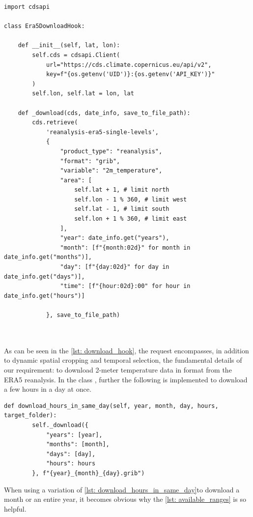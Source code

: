 \begin{lstlisting}[caption=Download Hook for ERA5 Data, label=lst: download_hook]
import cdsapi

class Era5DownloadHook:
    
    def __init__(self, lat, lon):
        self.cds = cdsapi.Client(
            url="https://cds.climate.copernicus.eu/api/v2",
            key=f"{os.getenv('UID')}:{os.getenv('API_KEY')}"
        )
        self.lon, self.lat = lon, lat

    def _download(cds, date_info, save_to_file_path):
        cds.retrieve(
            'reanalysis-era5-single-levels',
            {
                "product_type": "reanalysis",
                "format": "grib",
                "variable": "2m_temperature",
                "area": [
                    self.lat + 1, # limit north
                    self.lon - 1 % 360, # limit west
                    self.lat - 1, # limit south
                    self.lon + 1 % 360, # limit east
                ],
                "year": date_info.get("years"),
                "month": [f"{month:02d}" for month in date_info.get("months")],
                "day": [f"{day:02d}" for day in date_info.get("days")],
                "time": [f"{hour:02d}:00" for hour in date_info.get("hours")]

            }, save_to_file_path)



\end{lstlisting}

As can be seen in the \autoref{lst: download_hook}, the request encompasses, in addition to dynamic spatial cropping and temporal selection, the fundamental details of our requirement: to download 2-meter temperature data in  format from the ERA5 reanalysis.
In the class , further the following is implemented to download a few hours in a day at once.

\begin{lstlisting}[caption=Download Hours in Same Day in Download Hook Class, label=lst: download_hours_in_same_day]
    def download_hours_in_same_day(self, year, month, day, hours, target_folder):
        self._download({
            "years": [year],
            "months": [month],
            "days": [day],
            "hours": hours
        }, f"{year}_{month}_{day}.grib")
\end{lstlisting}

When using a variation of \autoref{lst: download_hours_in_same_day}to download a month or an entire year, it becomes obvious why the \autoref{lst: available_ranges} is so helpful.

